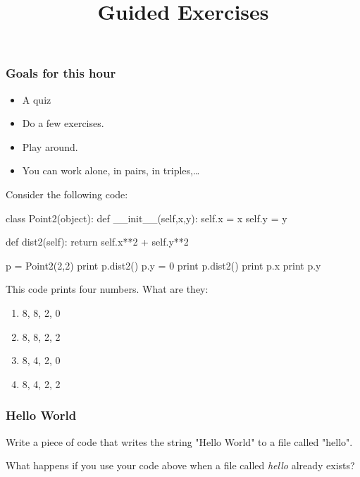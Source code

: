 
\title{Guided Exercises}

\frame{\maketitle}

\begin{frame}
\frametitle{Goals for this hour}

\begin{itemize}
\item A quiz
\item Do a few exercises.
\item Play around.
\item You can work alone, in pairs, in triples,\ldots
\end{itemize}

\end{frame}


\begin{frame}[fragile]
{}


Consider the following code:

\begin{python}
class Point2(object):
    def __init__(self,x,y):
        self.x = x
        self.y = y

    def dist2(self):
        return self.x**2 + self.y**2 

p = Point2(2,2)
print p.dist2()
p.y = 0
print p.dist2()
print p.x
print p.y
\end{python}

This code prints four numbers. What are they:

\begin{enumerate}[a]
\item 8, 8, 2, 0
\item 8, 8, 2, 2
\item 8, 4, 2, 0
\item 8, 4, 2, 2
\end{enumerate}

\end{frame}

\begin{frame}[fragile]
\frametitle{Hello World}

Write a piece of code that writes the string "Hello World" to a file called "hello".

\bigskip
What happens if you use your code above when a file called \textit{hello} already exists?

\end{frame}

